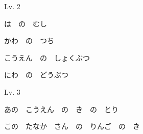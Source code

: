 	\begin{mondai}{Lv. 2}
		\item は　の　むし
		\item かわ　の　つち
		\item こうえん　の　しょくぶつ
		\item にわ　の　どうぶつ
	\end{mondai}
	
	\begin{mondai}{Lv. 3}
		\item あの　こうえん　の　き　の　とり
		\item この　たなか　さん　の　りんご　の　き
	\end{mondai}
	




